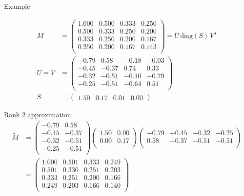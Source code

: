 \documentclass[11pt,ignorenonframetext,]{beamer}
\begin{document}
\begin{frame}{Example}

\footnotesize

\[ \begin{aligned}
M 
&= \begin{pmatrix}
  1.000 & 0.500 & 0.333 & 0.250 \\ 
  0.500 & 0.333 & 0.250 & 0.200 \\ 
  0.333 & 0.250 & 0.200 & 0.167 \\ 
  0.250 & 0.200 & 0.167 & 0.143 \\ 
\end{pmatrix} 
  = U \, \text{diag}(S) \, V^{\,t} \\
U = V &= \begin{pmatrix}
  -0.79 & 0.58 & -0.18 & -0.03 \\ 
  -0.45 & -0.37 & 0.74 & 0.33 \\ 
  -0.32 & -0.51 & -0.10 & -0.79 \\ 
  -0.25 & -0.51 & -0.64 & 0.51 \\ 
  \end{pmatrix} \\
S &= 
\begin{pmatrix} 1.50 & 0.17  & 0.01 & 0.00 \end{pmatrix}
\end{aligned} \]

\pause

\normalsize
Rank 2 approximation: \footnotesize
\[ \begin{aligned}
\tilde M
&= \begin{pmatrix}
  -0.79 &  0.58 \\ 
  -0.45 & -0.37 \\ 
  -0.32 & -0.51 \\ 
  -0.25 & -0.51 \\ 
\end{pmatrix}
\begin{pmatrix}
  1.50 & 0.00 \\ 
  0.00 & 0.17 \\ 
\end{pmatrix}
\begin{pmatrix}
  -0.79 & -0.45 & -0.32 & -0.25 \\ 
  0.58 & -0.37 & -0.51 & -0.51 \\ 
\end{pmatrix} \\
&= 
\begin{pmatrix}
  1.000 & 0.501 & 0.333 & 0.249 \\ 
  0.501 & 0.330 & 0.251 & 0.203 \\ 
  0.333 & 0.251 & 0.200 & 0.166 \\ 
  0.249 & 0.203 & 0.166 & 0.140 \\ 
\end{pmatrix}
\end{aligned} \]

\end{frame}
\end{document}
